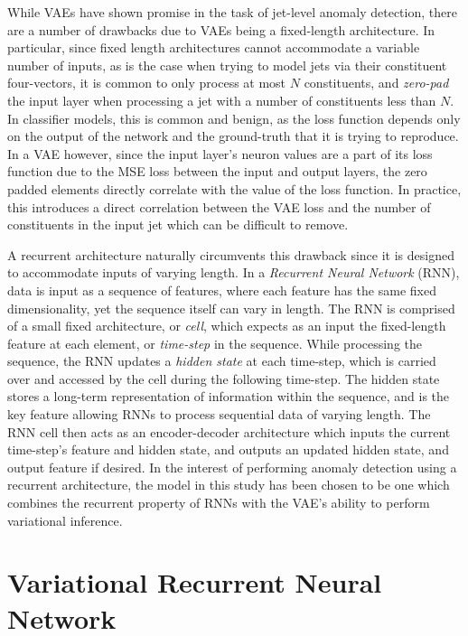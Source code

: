 \documentclass[12pt, a4paper]{article}
\begin{document}
While VAEs have shown promise in the task of jet-level anomaly detection, there are a number of drawbacks due to VAEs being a fixed-length architecture. In particular, since fixed length architectures cannot accommodate a variable number of inputs, as is the case when trying to model jets via their constituent four-vectors, it is common to only process at most $N$ constituents, and \textit{zero-pad} the input layer when processing a jet with a number of constituents less than $N$. In classifier models, this is common and benign, as the loss function depends only on the output of the network and the ground-truth that it is trying to reproduce. In a VAE however, since the input layer's neuron values are a part of its loss function due to the MSE loss between the input and output layers, the zero padded elements directly correlate with the value of the loss function. In practice, this introduces a direct correlation between the VAE loss and the number of constituents in the input jet which can be difficult to remove. 

A recurrent architecture naturally circumvents this drawback since it is designed to accommodate inputs of varying length. In a \textit{Recurrent Neural Network} (RNN), data is input as a sequence of features, where each feature has the same fixed dimensionality, yet the sequence itself can vary in length. The RNN is comprised of a small fixed architecture, or \textit{cell}, which expects as an input the fixed-length feature at each element, or \textit{time-step} in the sequence. While processing the sequence, the RNN updates a \textit{hidden state} at each time-step, which is carried over and accessed by the cell during the following time-step. The hidden state stores a long-term representation of information within the sequence, and is the key feature allowing RNNs to process sequential data of varying length. The RNN cell then acts as an encoder-decoder architecture which inputs the current time-step's feature and hidden state, and outputs an updated hidden state, and output feature if desired. In the interest of performing anomaly detection using a recurrent architecture, the model in this study has been chosen to be one which combines the recurrent property of RNNs with the VAE's ability to perform variational inference. 


\section{Variational Recurrent Neural Network}
\end{document}
